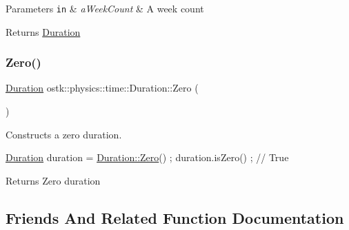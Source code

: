 \begin{DoxyParams}[1]{Parameters}
\mbox{\tt in}  & {\em a\+Week\+Count} & A week count \\
\hline
\end{DoxyParams}
\begin{DoxyReturn}{Returns}
\hyperlink{classostk_1_1physics_1_1time_1_1_duration}{Duration} 
\end{DoxyReturn}
\mbox{\label{classostk_1_1physics_1_1time_1_1_duration_acacd92afc598a3a48289307337fce217}} 
\subsubsection{\texorpdfstring{Zero()}{Zero()}}
{\footnotesize\ttfamily \hyperlink{classostk_1_1physics_1_1time_1_1_duration}{Duration} ostk\+::physics\+::time\+::\+Duration\+::\+Zero (\begin{DoxyParamCaption}{ }\end{DoxyParamCaption})\hspace{0.3cm}{\ttfamily [static]}}



Constructs a zero duration. 


\begin{DoxyCode}
\hyperlink{classostk_1_1physics_1_1time_1_1_duration_a6ba3a020742ca6e3bf0b1970dd039c07}{Duration} duration = \hyperlink{classostk_1_1physics_1_1time_1_1_duration_acacd92afc598a3a48289307337fce217}{Duration::Zero}() ;
duration.isZero() ; \textcolor{comment}{// True}
\end{DoxyCode}


\begin{DoxyReturn}{Returns}
Zero duration 
\end{DoxyReturn}


\subsection{Friends And Related Function Documentation}
\mbox{\label{classostk_1_1physics_1_1time_1_1_duration_a30be5772f32cb400f8d8a8e2975abf6d}} 
